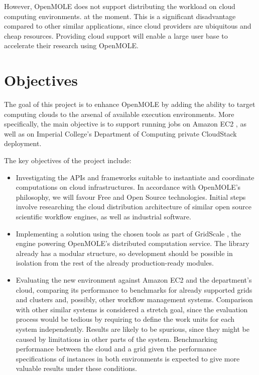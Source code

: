\documentclass[11pt,a4paper]{report}
\begin{document}
However, OpenMOLE does not support distributing the workload on cloud computing environments. at the moment. This is a significant disadvantage compared to other similar applications, since cloud providers are ubiquitous and cheap resources. Providing cloud support will enable a large user base to accelerate their research using OpenMOLE.

\section{Objectives}

The goal of this project is to enhance OpenMOLE by adding the ability to target computing clouds to the arsenal of available execution environments. More specifically, the main objective is to support running jobs on Amazon EC2 \cite{EC2}, as well as on Imperial College's Department of Computing private CloudStack deployment.


The key objectives of the project include:

\begin{itemize}
	\item Investigating the APIs and frameworks suitable to instantiate and coordinate computations on cloud infrastructures. In accordance with OpenMOLE's philosophy, we will favour Free and Open Source technologies. Initial steps involve researching the cloud distribution architecture of similar open source scientific workflow engines, as well as industrial software.
	\item Implementing a solution using the chosen tools as part of GridScale \cite{Passerat2016}, the engine powering OpenMOLE's distributed computation service. The library already has a modular structure, so development should be possible in isolation from the rest of the already production-ready modules.
	\item Evaluating the new environment against Amazon EC2 and the department's cloud, comparing its performance to benchmarks for already supported grids and clusters and, possibly, other workflow management systems. Comparison with other similar systems is considered a stretch goal, since the evaluation process would be tedious by requiring to define the work units for each system independently. Results are likely to be spurious, since they might be caused by limitations in other parts of the system. Benchmarking performance between the cloud and a grid given the performance specifications of instances in both environments is expected to give more valuable results under these conditions.
\end{itemize}
\end{document}
